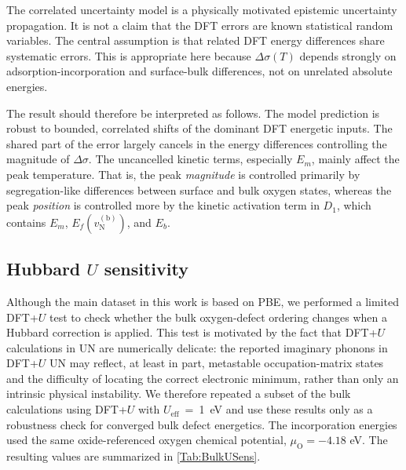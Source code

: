 \documentclass[preprint,12pt,sort&compress]{elsarticle}
\newcommand{\?}{\stackrel{?}{=}}
\begin{document}
The correlated uncertainty model is a physically motivated epistemic uncertainty propagation. It is not a claim that the DFT errors are known statistical random variables. The central assumption is that related DFT energy differences share systematic errors. This is appropriate here because $\Delta\sigma(T)$ depends strongly on adsorption-incorporation and surface-bulk differences, not on unrelated absolute energies.

The result should therefore be interpreted as follows. The model prediction is robust to bounded, correlated shifts of the dominant DFT energetic inputs. The shared part of the error largely cancels in the energy differences controlling the magnitude of $\Delta\sigma$. The uncancelled kinetic terms, especially $E_m$, mainly affect the peak temperature. That is, the peak \textit{magnitude} is controlled primarily by segregation-like differences between surface and bulk oxygen states, whereas the peak \textit{position} is controlled more by the kinetic activation term in $D_1$, which contains $E_m$, $E_f(v_\mathrm{N}^{(\mathrm{b})})$, and $E_b$.

\subsection{Hubbard $U$ sensitivity}
\label{App:UQ:U}

Although the main dataset in this work is based on PBE, we performed a limited DFT+$U$ test to check whether the bulk oxygen-defect ordering changes when a Hubbard correction is applied. This test is motivated by the fact that DFT+$U$ calculations in UN are numerically delicate: the reported imaginary phonons in DFT+$U$ UN \cite{Kocevski2022I} may reflect, at least in part, metastable occupation-matrix states and the difficulty of locating the correct electronic minimum, rather than only an intrinsic physical instability. We therefore repeated a subset of the bulk calculations using DFT+$U$ with $U_\text{eff}$~=~1~eV and use these results only as a robustness check for converged bulk defect energetics. The incorporation energies used the same oxide-referenced oxygen chemical potential, $\mu_\mathrm{O}=-4.18$ eV. The resulting values are summarized in \cref{Tab:BulkUSens}.
\end{document}
